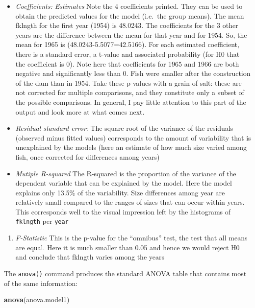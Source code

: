 \documentclass[
  12pt,
]{book}
\newenvironment{Shaded}{\begin{snugshade}}{\end{snugshade}}
\newcommand{\KeywordTok}[1]{\textcolor[rgb]{0.13,0.29,0.53}{\textbf{#1}}}
\newcommand{\NormalTok}[1]{#1}
\providecommand{\tightlist}{%
  \setlength{\itemsep}{0pt}\setlength{\parskip}{0pt}}
\begin{document}
\begin{itemize}
\tightlist
\item
  \emph{Coefficients: Estimates} Note the 4 coefficients printed. They can be used to obtain the predicted values for the model (i.e.~the group means). The mean fklngth for the first year (1954) is 48.0243. The coefficients for the 3 other years are the difference between the mean for that year and for 1954. So, the mean for 1965 is (48.0243-5.5077=42.5166). For each estimated coefficient, there is a standard error, a t-value and associated probability (for H0 that the coefficient is 0). Note here that coefficients for 1965 and 1966 are both negative and significantly less than 0. Fish were smaller after the construction of the dam than in 1954. Take these p-values with a grain of salt: these are not corrected for multiple comparisons, and they constitute only a subset of the possible comparisons. In general, I pay little attention to this part of the output and look more at what comes next.
\item
  \emph{Residual standard error}: The square root of the variance of the residuals (observed minus fitted values) corresponds to the amount of variability that is unexplained by the models (here an estimate of how much size varied among fish, once corrected for differences among years)
\item
  \emph{Mutiple R-squared} The R-squared is the proportion of the variance of the dependent variable that can be explained by the model. Here the model explains only 13.5\% of the variability. Size differences among year are relatively small compared to the ranges of sizes that can occur within years. This corresponds well to the visual impression left by the histograms of \texttt{fklngth} per \texttt{year}
\end{itemize}

\begin{enumerate}
\def\labelenumi{\arabic{enumi}.}
\setcounter{enumi}{3}
\tightlist
\item
  \emph{F-Statistic} This is the p-value for the ``omnibus'' test, the test that all means are equal. Here it is much smaller than 0.05 and hence we would reject H0 and conclude that fklngth varies among the years
\end{enumerate}

The \texttt{anova()} command produces the standard ANOVA table that contains most of the same information:

\begin{Shaded}
\begin{Highlighting}[]
\KeywordTok{anova}\NormalTok{(anova.model1)}
\end{Highlighting}
\end{Shaded}
\end{document}
